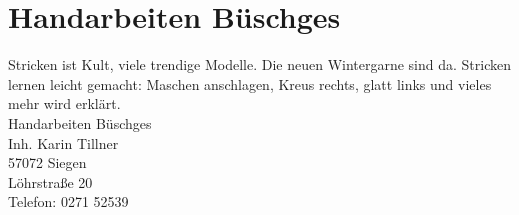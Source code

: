 \section{Handarbeiten Büschges}
Stricken ist Kult, viele trendige Modelle. Die neuen Wintergarne sind da. Stricken lernen leicht gemacht: Maschen anschlagen, Kreus rechts, glatt links und vieles mehr wird erklärt.\\
Handarbeiten Büschges\\
Inh. Karin Tillner\\
57072 Siegen\\
Löhrstraße 20\\
Telefon: 0271 52539